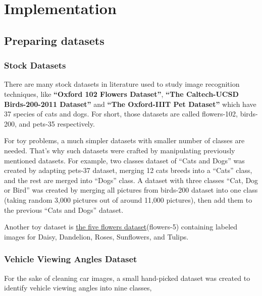 \chapter{Implementation}

\section{Preparing datasets}

\subsection{Stock Datasets}

There are many stock datasets in literature used to study image recognition techniques, like
\textbf{``Oxford 102 Flowers Dataset''}\autocite{nilsback2008automated},
\textbf{``The Caltech-UCSD Birds-200-2011 Dataset''}\autocite{WahCUB_200_2011}
and \textbf{``The Oxford-IIIT Pet Dataset''}\autocite{parkhi12a} which have 37 species of cats and dogs.
For short, those datasets are called flowers-102, birds-200, and pets-35 respectively.

For toy problems, a much simpler datasets with smaller number of classes are needed.
That's why such datasets were crafted by manipulating previously mentioned datasets.
For example, two classes dataset of ``Cats and Dogs'' was created by adapting pets-37 dataset, merging 12 cats breeds into a ``Cats'' class, and the rest are merged into ``Dogs'' class.
A dataset with three classes ``Cat, Dog or Bird''
was created by merging all pictures from birds-200 dataset into one class
(taking random 3,000 pictures out of around 11,000 pictures),
then add them to the previous ``Cats and Dogs'' dataset.

Another toy dataset is \href{http://download.tensorflow.org/example_images/flower_photos.tgz}{the five flowers dataset}(flowers-5)
containing labeled images for Daisy, Dandelion, Roses, Sunflowers, and Tulips.

\subsection{Vehicle Viewing Angles Dataset}

For the sake of cleaning car images, a small hand-picked dataset was created to identify vehicle viewing angles into nine classes, 

